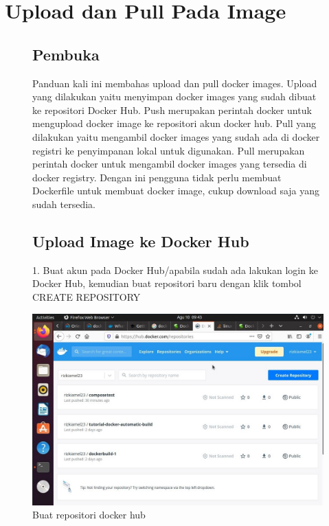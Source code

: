 \chapter{Upload dan Pull Pada Image}

\begin{figure}
\section{Pembuka}
Panduan kali ini membahas upload dan pull docker images. Upload yang dilakukan yaitu menyimpan docker images yang sudah dibuat ke repositori Docker Hub.
Push merupakan perintah docker untuk mengupload docker image ke repositori akun docker hub. 
Pull yang dilakukan yaitu mengambil docker images yang sudah ada di docker registri ke penyimpanan lokal untuk digunakan. 
Pull merupakan perintah docker untuk mengambil docker images yang tersedia di docker registry. Dengan ini pengguna tidak perlu membuat Dockerfile untuk membuat docker image, cukup download saja yang sudah tersedia.

    \section{Upload Image ke Docker Hub}

    1. Buat akun pada Docker Hub/apabila sudah ada lakukan login ke Docker Hub, kemudian buat repositori baru dengan klik tombol CREATE REPOSITORY
        \begin{center}
            \includegraphics[width=\linewidth]{image/26.jpg}
            \caption{Buat repositori docker hub}
            \label{fig:my_figure}
        \end{center}

\end{figure}
